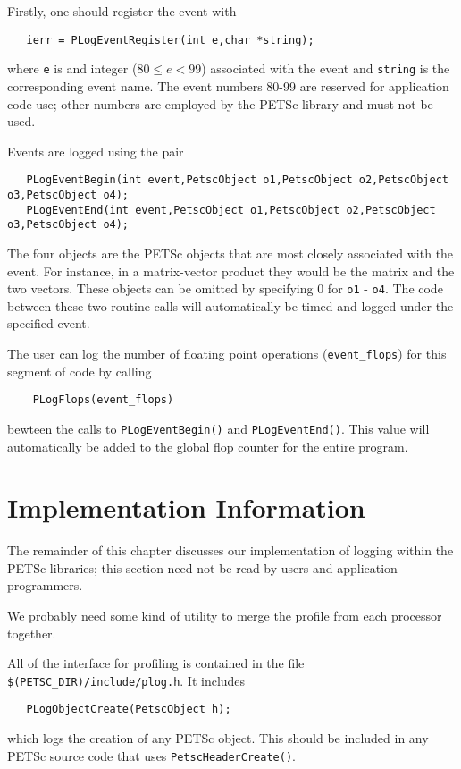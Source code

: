 Firstly, one should register the event with 
\begin{verbatim}
   ierr = PLogEventRegister(int e,char *string);
\end{verbatim}
where {\tt e} is and integer ($80 \leq e < 99$) associated with the event
and {\tt string} is the corresponding event name.  The event numbers
80-99 are reserved for application code use; other numbers are employed
by the PETSc library and must not be used.

Events are logged using the pair 
\begin{verbatim}
   PLogEventBegin(int event,PetscObject o1,PetscObject o2,PetscObject o3,PetscObject o4);
   PLogEventEnd(int event,PetscObject o1,PetscObject o2,PetscObject o3,PetscObject o4);
\end{verbatim}
The 
four objects are the PETSc objects that are most closely associated 
with the event.  For instance, in a matrix-vector product they 
would be the matrix and the two vectors.  These objects can be omitted
by specifying 0 for {\tt o1} - {\tt o4}.  The code between these 
two routine calls will automatically be timed and logged under the
specified event.

The user can log the number of floating point operations ({\tt event\_flops}) 
for this segment of code by calling 
\begin{verbatim}
    PLogFlops(event_flops)
\end{verbatim}
bewteen the calls to {\tt PLogEventBegin()} and {\tt PLogEventEnd()}.
This value will automatically be added to the global flop counter for the
entire program.

\section{Implementation Information}

The remainder of this chapter discusses our implementation of logging 
within the PETSc libraries; this section
need not be read by users and application programmers.

\begin{design}
We probably need some kind of utility to merge the profile from each 
processor together.
\end{design}

All of the interface for profiling is contained in the file 
{\tt \$(PETSC\_DIR)/include/plog.h}. It includes 
\begin{verbatim}
   PLogObjectCreate(PetscObject h);
\end{verbatim}
which logs the creation of any PETSc object. This should be included in 
any PETSc source code that uses {\tt PetscHeaderCreate()}. 

